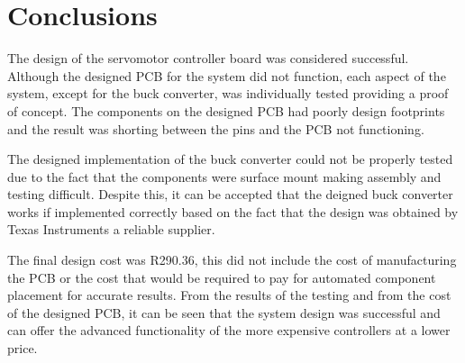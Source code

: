 \chapter{Conclusions}

The design of the servomotor controller board was considered successful. Although the designed PCB for the system did not function, each aspect of the system, except for the buck converter, was individually tested providing a proof of concept. The components on the designed PCB had poorly design footprints and the result was shorting between the pins and the PCB not functioning.   

The designed implementation of the buck converter could not be properly tested due to the fact that the components were surface mount making assembly and testing difficult. Despite this, it can be accepted that the deigned buck converter works if implemented correctly based on the fact that the design was obtained by Texas Instruments a reliable supplier.

The final design cost was R290.36, this did not include the cost of manufacturing the PCB or the cost that would be required to pay for automated component placement for accurate results. From the results of the testing and from the cost of the designed PCB, it can be seen that the system design was successful and can offer the advanced functionality of the more expensive controllers at a lower price.
